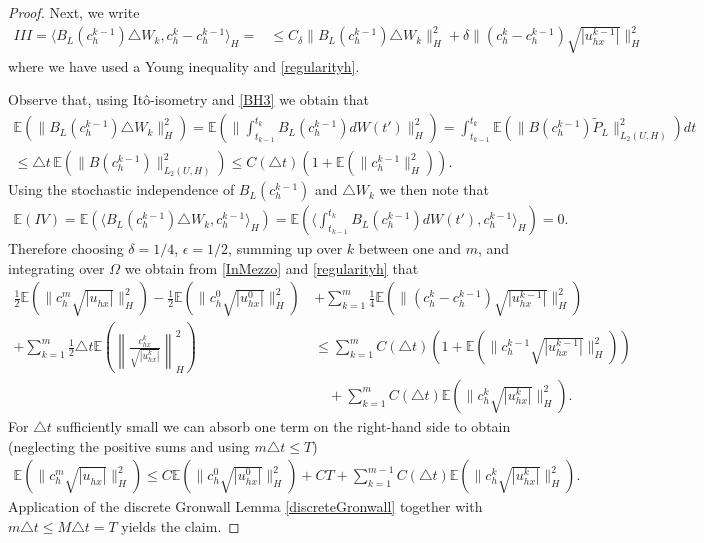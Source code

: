 \documentclass[a4paper,10pt]{article}
\def\Bapprox{B_L}
\def\proj{\tilde{P}}
\numberwithin{equation}{section}
\begin{document}
\begin{proof}
Next, we write
\begin{align*}
III= \langle \Bapprox(c^{k-1}_{h})\triangle W_{k},c^{k}_{h} -c^{k-1}_{h} \rangle_{H}=
& \leq C_{\delta} \| \Bapprox(c^{k-1}_{h})\triangle W_{k}\|^{2}_{H} +\delta \| (c^{k}_{h} - c^{k-1}_{h}) \sqrt{|u^{k-1}_{hx}|}\|_{H}^{2}
\end{align*}
where we have used a Young inequality and \eqref{regularityh}.

Observe that, using It\^o-isometry
\cite[Rem. B.0.6 (iii)]{RoecknerBuch} and \eqref{BH3} we obtain that
\begin{multline*} \mathbb{E} ( \| \Bapprox(c^{k-1}_{h})\triangle W_{k}\|^{2}_{H}) = \mathbb{E} ( \| \int_{t_{k-1}}^{t_{k}} \Bapprox(c^{k-1}_{h}) dW(t')\|^{2}_{H} ) = \int_{t_{k-1}}^{t_{k}} \mathbb{E} (\| B(c^{k-1}_{h}) \proj_{L} \|^{2}_{L_{2}(U,H)}) dt \\
\leq \triangle t \, \mathbb{E} (\| B(c^{k-1}_{h}) \|^{2}_{L_{2}(U,H)}) \leq C(\triangle t) (1 + \mathbb{E}(\|c^{k-1}_{h}\|^{2}_{H} )).
\end{multline*}
Using the stochastic independence
of $\Bapprox(c^{k-1}_{h})$ and $\triangle W_{k}$ we then note that
\begin{align*}
\mathbb{E}(IV)=\mathbb{E} (\langle \Bapprox(c^{k-1}_{h})\triangle W_{k}, c^{k-1}_{h} \rangle_{H})=
\mathbb{E} (\langle \int_{t_{k-1}}^{t_{k}} \Bapprox(c^{k-1}_{h}) dW(t'), c^{k-1}_{h} \rangle_{H} )=
0.
\end{align*}
Therefore choosing $\delta=1/4$, $\epsilon=1/2$, summing up over $k$ between one and $m$, and integrating over $\Omega$ we obtain from \eqref{InMezzo} and \eqref{regularityh} that
\begin{align*}
\frac{1}{2 } \mathbb{E} (\| c^{m}_{h}\sqrt{|u^{}_{hx}|} \|^{2}_{H})- \frac{1}{2 } \mathbb{E}( \| c_{h}^{0}\sqrt{|u^{0}_{hx}|}\|^{2}_{H} ) \, &+ \sum_{k=1}^{m}\frac{1}{4 } \mathbb{E}(\|(c_{h}^{k} -c_{h}^{k-1})\sqrt{|u^{k-1}_{hx}|}\|^{2}_{H})\\
+\sum_{k=1}^{m} \frac{1}{2}\triangle t \mathbb{E} \left(\left \| \frac{c_{hx}^{k}}{\sqrt{|u^{k}_{hx}| } } \right \|^{2}_{H} \right)
&\leq \sum_{k=1}^{m} C(\triangle t) (1 + \mathbb{E}(\|c^{k-1}_{h} \sqrt{|u^{k-1}_{hx}|}\|^{2}_{H} )) \\
& \quad + \sum_{k=1}^{m} C ( \triangle t) \mathbb{E}(\| c^{k}_{h}\sqrt{|u^{k}_{hx}|} \|^{2}_{H}).
\end{align*}
For $ \triangle t $ sufficiently small we can absorb one term on the right-hand side to obtain (neglecting the positive sums and using $m \triangle t \leq T$)
\begin{align*}
\mathbb{E} (\| c^{m}_{h}\sqrt{|u^{}_{hx}|} \|^{2}_{H}) \leq C \mathbb{E}( \| c_{h}^{0}\sqrt{|u^{0}_{hx}|}\|^{2}_{H} ) +CT + \sum_{k=1}^{m-1} C(\triangle t ) \mathbb{E}(\|c^{k}_{h} \sqrt{|u^{k}_{hx}|}\|^{2}_{H} ).
\end{align*}
Application of the discrete Gronwall Lemma \ref{discreteGronwall} together with $m \triangle t \leq M \triangle t= T$ yields the claim.
\end{proof}
\end{document}
